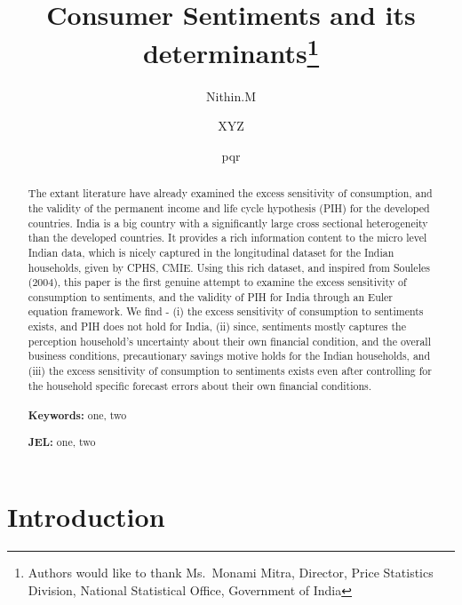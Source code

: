\documentclass[
  a4paper,
  abstract]{scrartcl}
\title{Consumer Sentiments and its determinants\thanks{Authors would
like to thank Ms.~Monami Mitra, Director, Price Statistics Division,
National Statistical Office, Government of India}}
\author[1]{Nithin.M}
\author[2]{XYZ}
\author[1, 2]{pqr}
\affil[1]{
      Department of Humanities and Social Sciences, IIT Kharagpur
  }
\affil[2]{
      University of Hyderabad
  }
\date{}
\begin{document}
\maketitle

\begin{abstract}
The extant literature have already examined the excess sensitivity of
consumption, and the validity of the permanent income and life cycle
hypothesis (PIH) for the developed countries. India is a big country
with a significantly large cross sectional heterogeneity than the
developed countries. It provides a rich information content to the micro
level Indian data, which is nicely captured in the longitudinal dataset
for the Indian households, given by CPHS, CMIE. Using this rich dataset,
and inspired from Souleles (2004), this paper is the first genuine
attempt to examine the excess sensitivity of consumption to sentiments,
and the validity of PIH for India through an Euler equation framework.
We find - (i) the excess sensitivity of consumption to sentiments
exists, and PIH does not hold for India, (ii) since, sentiments mostly
captures the perception household's uncertainty about their own
financial condition, and the overall business conditions, precautionary
savings motive holds for the Indian households, and (iii) the excess
sensitivity of consumption to sentiments exists even after controlling
for the household specific forecast errors about their own financial
conditions. %
\\
\\
\noindent%
\textbf{Keywords:} one, two %
 
\noindent%
\textbf{JEL:} one, two
\end{abstract}


\newpage

\section{Introduction}\label{sec-1}
\end{document}
